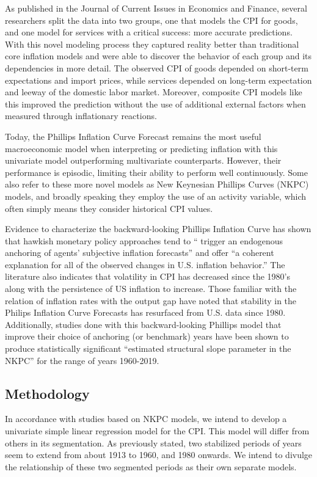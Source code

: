 \documentclass[
]{article}
\begin{document}
As published in the Journal of Current Issues in Economics and Finance,
several researchers split the data into two groups, one that models the
CPI for goods, and one model for services with a critical success: more
accurate predictions. With this novel modeling process they captured
reality better than traditional core inflation models and were able to
discover the behavior of each group and its dependencies in more detail.
The observed CPI of goods depended on short-term expectations and import
prices, while services depended on long-term expectation and leeway of
the domestic labor market. Moreover, composite CPI models like this
improved the prediction without the use of additional external factors
when measured through inflationary reactions.

Today, the Phillips Inflation Curve Forecast remains the most useful
macroeconomic model when interpreting or predicting inflation with this
univariate model outperforming multivariate counterparts. However, their
performance is episodic, limiting their ability to perform well
continuously. Some also refer to these more novel models as New
Keynesian Phillips Curves (NKPC) models, and broadly speaking they
employ the use of an activity variable, which often simply means they
consider historical CPI values.

Evidence to characterize the backward-looking Phillips Inflation Curve
has shown that hawkish monetary policy approaches tend to `` trigger an
endogenous anchoring of agents' subjective inflation forecasts'' and
offer ``a coherent explanation for all of the observed changes in U.S.
inflation behavior.'' The literature also indicates that volatility in
CPI has decreased since the 1980's along with the persistence of US
inflation to increase. Those familiar with the relation of inflation
rates with the output gap have noted that stability in the Philips
Inflation Curve Forecasts has resurfaced from U.S. data since 1980.
Additionally, studies done with this backward-looking Phillips model
that improve their choice of anchoring (or benchmark) years have been
shown to produce statistically significant ``estimated structural slope
parameter in the NKPC'' for the range of years 1960-2019.

\hypertarget{methodology}{%
\subsection{Methodology}\label{methodology}}

In accordance with studies based on NKPC models, we intend to develop a
univariate simple linear regression model for the CPI. This model will
differ from others in its segmentation. As previously stated, two
stabilized periods of years seem to extend from about 1913 to 1960, and
1980 onwards. We intend to divulge the relationship of these two
segmented periods as their own separate models.
\end{document}
